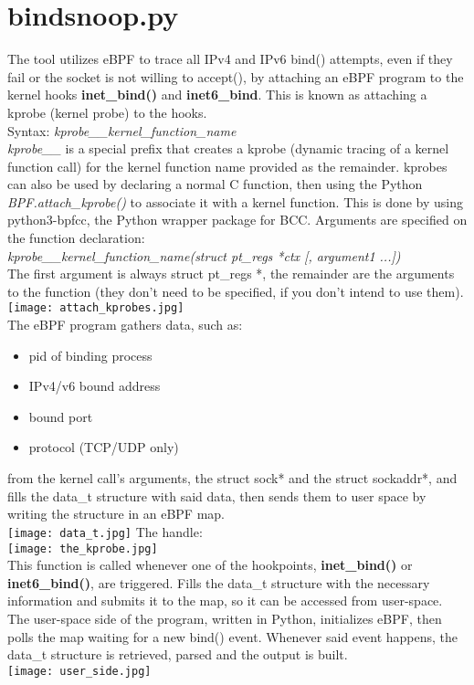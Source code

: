 \documentclass[12pt]{report}
\begin{document}
\section*{bindsnoop.py}
The tool utilizes eBPF to trace all IPv4 and IPv6 bind() attempts, even if they fail or the socket is not willing to accept(), by attaching an eBPF program to the kernel hooks \textbf{inet\_bind()} and \textbf{inet6\_bind}. This is known as attaching a kprobe (kernel probe) to the hooks.
\\[\baselineskip]
Syntax: \textit{kprobe\_\_kernel\_function\_name}
\\[\baselineskip]
\textit{kprobe\_\_} is a special prefix that creates a kprobe (dynamic tracing of a kernel function call) for the kernel function name provided as the remainder. kprobes can also be used by declaring a normal C function, then using the Python \textit{BPF.attach\_kprobe()} to associate it with a kernel function. This is done by using python3-bpfcc, the Python wrapper package for BCC.
\newline 
Arguments are specified on the function declaration:
\\[\baselineskip]
\textit{kprobe\_\_kernel\_function\_name(struct pt\_regs *ctx [, argument1 ...])}
\\[\baselineskip]
The first argument is always struct pt\_regs *, the remainder are the arguments to the function (they don't need to be specified, if you don't intend to use them).
\\[\baselineskip]
\texttt{[image: attach\_kprobes.jpg]}
\\[\baselineskip]
The eBPF program gathers data, such as:
	\begin{itemize}
		\item pid of binding process
		\item IPv4/v6 bound address
		\item bound port
		\item protocol (TCP/UDP only)
	\end{itemize}
from the kernel call's arguments, the struct sock* and the struct sockaddr*, and fills the data\_t structure with said data, then sends them to user space by writing the structure in an eBPF map.
\\[\baselineskip]
\texttt{[image: data\_t.jpg]}
\clearpage
The handle:
\\[2\baselineskip]
\texttt{[image: the\_kprobe.jpg]}
\\[2\baselineskip]
This function is called whenever one of the hookpoints, \textbf{inet\_bind()} or \textbf{inet6\_bind()}, are triggered. Fills the data\_t structure with the necessary information and submits it to the map, so it can be accessed from user-space.
\clearpage
The user-space side of the program, written in Python, initializes eBPF, then polls the map waiting for a new bind() event. Whenever said event happens, the data\_t structure is retrieved, parsed and the output is built.
\\[2\baselineskip]
\texttt{[image: user\_side.jpg]}
\end{document}
